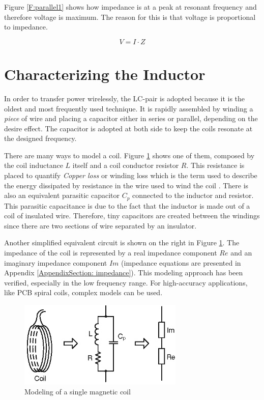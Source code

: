 Figure \ref{F:parallel1} shows how impedance is at a peak at resonant frequency and therefore voltage is maximum. The reason for this is that voltage is proportional to impedance. 

\begin{equation}
	V = I\cdot{Z}
\end{equation}


	\section{Characterizing the Inductor} %
In order to transfer power wirelessly, the LC-pair is adopted because it is the oldest and most frequently used technique. It is rapidly assembled by winding a \textit{piece} of wire and placing a capacitor either in series or parallel, depending on the desire effect. The capacitor is adopted at both side to keep the coils resonate at the designed frequency.

There are many ways to model a coil. Figure \ref{F:modelingCoil} shows one of them, composed by the coil inductance $L$ itself and a coil conductor resistor $R$. This resistance is placed to quantify \textit{Copper loss} or winding loss which is the term used to describe the energy dissipated by resistance in the wire used to wind the coil \cite{CopperLoss}. There is also an equivalent parasitic capacitor $C_{p}$ connected to the inductor and resistor. This parasitic capacitance is due to the fact that the inductor is made out of a coil of insulated wire. Therefore, tiny capacitors are created between the windings since there are two sections of wire separated by an insulator. 

Another simplified equivalent circuit is shown on the right in Figure \ref{F:modelingCoil}. The impedance of the coil is represented by a real impedance component $Re$ and an imaginary impedance component $Im$ (impedance equations are presented in Appendix \ref{AppendixSection: impedance}). This modeling approach has been verified, especially in the low frequency range\cite{medical}. For high-accuracy applications, like PCB spiral coils, complex models \cite{Eddy} can be used. 

\begin{figure}[h]
\begin{center}
	\includegraphics[width=0.7\textwidth]{./images/med}
\caption{Modeling of a single magnetic coil}
\label{F:modelingCoil}
\end{center}
\end{figure}

